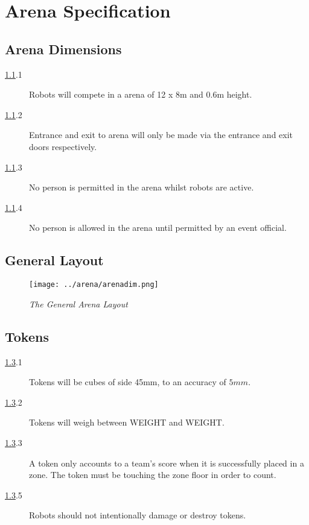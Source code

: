 \section {Arena Specification}

\subsection {Arena Dimensions}
\label{arena}

\begin {description}
\item [\ref{arena}.1] Robots will compete in a arena of 12 x 8m and 0.6m height.
\item [\ref{arena}.2] Entrance and exit to arena will only be made via the entrance and exit doors respectively.
\item [\ref{arena}.3] No person is permitted in the arena whilst robots are active.
\item [\ref{arena}.4] No person is allowed in the arena until permitted by an event official.
\end {description}

\subsection {General Layout}
\label{arenagenlay}

\begin {figure}[h]
\begin {center}
\texttt{[image: ../arena/arenadim.png]}
\caption{\small{\emph{The General Arena Layout}}}
\label {fig:arena}
\end {center}
\end {figure}

\subsection {Tokens}
\label{tokens}

\begin {description} 
\item [\ref{tokens}.1] Tokens will be cubes of side 45mm, to an accuracy of $5mm$.
\item [\ref{tokens}.2] Tokens will weigh between WEIGHT and WEIGHT.
\item [\ref{tokens}.3] A token only accounts to a team's score when it is successfully placed in a zone. The token must be touching the zone floor in order to count.
\item [\ref{tokens}.5] Robots should not intentionally damage or destroy tokens.
\end {description}

